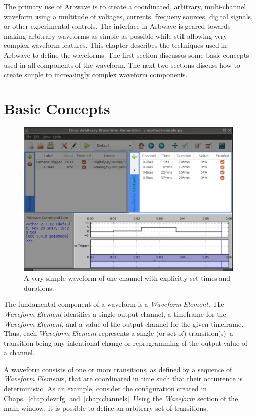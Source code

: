 \thispagestyle{fancy}
\pagestyle{fancy}

The primary use of Arbwave is to create a coordinated, arbitrary, multi-channel
waveform using a multitude of voltages, currents, frequeny sources, digital
signals, or other experimental controls.  The interface in Arbwave is geared
towards making arbitrary waveforms as simple as possible while still allowing
very complex waveform features.  This chapter describes the techniques used in
Arbwave to define the waveforms.  The first section discusses some basic
concepts used in all components of the waveform.  The next two sections discuss
how to create simple to increasingly complex waveform components.

\section{Basic Concepts}
\begin{figure}[ht]
  \centerline{\includegraphics[width=.8\textwidth]{figures/basic-waveform}}
  \caption[Very simple waveform]{
    A very simple waveform of one channel with explicitly set times and
    durations.
  }
  \label{fig:quick:basic-waveform}
\end{figure}

The fundamental component of a waveform is a \textit{Waveform Element}.  The
\textit{Waveform Element} identifies a single output channel, a timeframe for
the \textit{Waveform Element}, and a value of the output channel for the given
timeframe.  Thus, each \textit{Waveform Element} represents a single (or set of)
transition(s)--a transition being any intentional change or reprogramming of the
output value of a channel.

A waveform consists of one or more transitions, as defined by a sequence of
\textit{Waveform Element}s, that are coordinated in time such that their
occurrence is deterministic.  As an example, consider the configuration created
in Chaps.~\ref{chap:devcfg} and~\ref{chap:channels}.  Using the \textit{Waveform}
section of the main window, it is possible to define an arbitrary set of
transitions.

